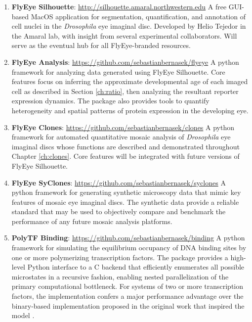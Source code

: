 \begin{enumerate}
  
  \item \textbf{FlyEye Silhouette}: \url{http://silhouette.amaral.northwestern.edu}
  \newline
  A free GUI-based MacOS application for segmentation, quantification, and annotation of cell nuclei in the \textit{Drosophila} eye imaginal disc. Developed by Helio Tejedor in the Amaral lab, with insight from several experimental collaborators. Will serve as the eventual hub for all FlyEye-branded resources.
  
  \item \textbf{FlyEye Analysis}: \url{https://github.com/sebastianbernasek/flyeye}
  \newline
  A python framework for analyzing data generated using FlyEye Silhouette. Core features focus on inferring the approximate developmental age of each imaged cell as described in Section \ref{ch:ratio}, then analyzing the resultant reporter expression dynamics. The package also provides tools to quantify heterogeneity and spatial patterns of protein expression in the developing eye.
  
  \item \textbf{FlyEye Clones}: \url{https://github.com/sebastianbernasek/clones}  
  \newline
  A python framework for automated quantitative mosaic analysis of \textit{Drosophila} eye imaginal discs whose functions are described and demonstrated throughout Chapter \ref{ch:clones}. Core features will be integrated with future versions of FlyEye Silhouette. 
  
  \item \textbf{FlyEye SyClones}: \url{https://github.com/sebastianbernasek/syclones}
  \newline 
  A python framework for generating synthetic microscopy data that mimic key features of mosaic eye imaginal discs. The synthetic data provide a reliable standard that may be used to objectively compare and benchmark the performance of any future mosaic analysis platforms.
  
  \item \textbf{PolyTF Binding}: \url{https://github.com/sebastianbernasek/binding}
  \newline 
  A python framework for simulating the equilibrium occupancy of DNA binding sites by one or more polymerizing transcription factors. The package provides a high-level Python interface to a C backend that efficiently enumerates all possible microstates in a recursive fashion, enabling nested parallelization of the primary computational bottleneck. For systems of two or more transcription factors, the implementation confers a major performance advantage over the binary-based implementation proposed in the original work that inspired the model \cite{Hope2017}.
  

\end{enumerate}
